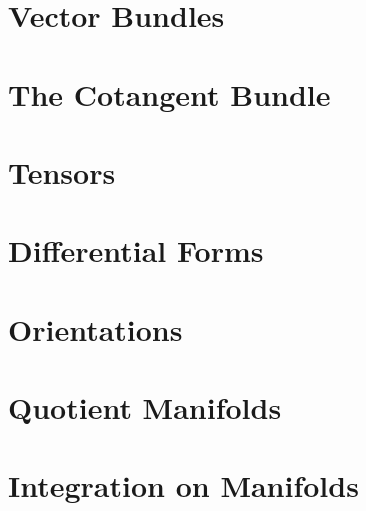 \documentclass[12pt, a4paper, oneside, openright, titlepage]{book}
\begin{document}
\chapter{\textsection Vector Bundles}


\chapter{\textsection The Cotangent Bundle}


\chapter{\textsection Tensors}


\chapter{\textsection Differential Forms}


\chapter{\textsection Orientations}


\chapter{\textsection Quotient Manifolds}


\chapter{\textsection Integration on Manifolds}
\end{document}
